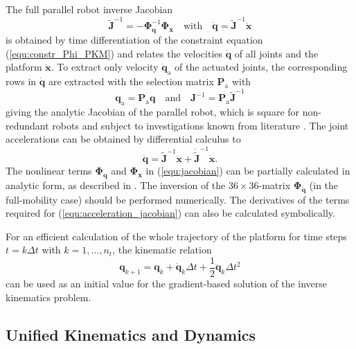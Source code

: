 \documentclass[fleqn,a4paper,10pt]{article}
\newcommand{\bm}[1]{\mathbf{#1}}
\renewcommand{\Phi}[1]{\varPhi{#1}}
\begin{document}
\begin{multicols}{2}
The full parallel robot inverse Jacobian 
%
\begin{equation}
\tilde{\bm{J}}^{-1}=-\bm{\Phi}_{\bm{q}}^{-1} \bm{\Phi}_{\bm{x}}
\quad \mathrm{with} \quad
\dot{\bm{q}}=\tilde{\bm{J}}^{-1} \dot{\bm{x}}
\label{equ:jacobian}
\end{equation}
%
is obtained by time differentiation of the constraint equation (\ref{equ:constr_Phi_PKM})  and relates the velocities $\dot{\bm{q}}$ of all joints and the platform $\dot{\bm{x}}$.
To extract only velocity $\dot{\bm{q}}_\mathrm{a}$ of the actuated joints, the corresponding rows in $\dot{\bm{q}}$ are extracted with the selection matrix $\bm{P}_{\mathrm{a}}$ with
%
\begin{equation}
\bm{q}_{\mathrm{a}} = \bm{P}_{\mathrm{a}} \bm{q}
\quad \mathrm{and} \quad
\bm{J}^{-1}=\bm{P}_{\mathrm{a}} \tilde{\bm{J}}^{-1}
\label{equ:jacobian_actuation}
\end{equation}
%
giving the analytic Jacobian of the parallel robot, which is square for non-redundant robots and subject to investigations known from literature \cite{Merlet2006}.
The joint accelerations can be obtained by differential calculus to
%
\begin{equation}
\ddot{\bm{q}}=\tilde{\bm{J}}^{-1}\ddot{\bm{x}}+\dot{\tilde{\bm{J}}}^{-1}\dot{\bm{x}}.
\label{equ:acceleration_jacobian}
\end{equation}
%
The nonlinear terms $\bm{\Phi}_{\bm{q}}$ and $\bm{\Phi}_{\bm{x}}$ in (\ref{equ:jacobian}) can be partially  calculated in analytic form, as described in \cite{SchapplerTapOrt2019c}.
The inversion of the $36 \times 36$-matrix $\bm{\Phi}_{\bm{q}}$ (in the full-mobility case) should be performed numerically.
The derivatives of the terms required for (\ref{equ:acceleration_jacobian}) can also be calculated symbolically.

For an efficient calculation of the whole trajectory of the platform for time steps $t=k \Delta t$ with $k=1,...,n_t$, the kinematic relation
%
\begin{equation}
\bm{q}_{k+1}=\bm{q}_k+\dot{\bm{q}}_k \Delta t+\frac{1}{2}\ddot{\bm{q}}_k\Delta t^2
\label{equ:IK_initialvalue}
\end{equation}
%
can be used as an initial value for the gradient-based solution of the inverse kinematics problem.

\subsection{Unified Kinematics and Dynamics}
\label{sec:kindyn}


\end{multicols}
\end{document}
